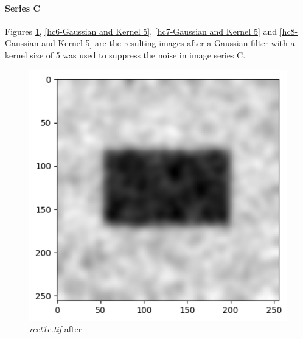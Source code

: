 \documentclass[runningheads]{llncs}
\begin{document}
\paragraph*{\textbf{Series C}}
Figures \ref{hc5-Gaussian and Kernel 5}, \ref{hc6-Gaussian and Kernel 5}, \ref{hc7-Gaussian and Kernel 5} and \ref{hc8-Gaussian and Kernel 5} are the resulting images after a Gaussian filter with a kernel size of 5 was used to suppress the noise in image series C. 
\begin{figure}[h!]
\begin{minipage}[h]{0.5\linewidth}
\begin{center}
\includegraphics[width=1\linewidth]{Report/Result_Images/image_hc5.png} 
\caption{\emph{rect1c.tif} after}
\label{hc5-Gaussian and Kernel 5}
\end{center} 
\end{minipage}
\hfill
\vspace{0.2 cm}
\begin{minipage}[h]{0.47\linewidth}
\begin{center}

\end{center}
\end{minipage}
\end{figure}
\end{document}
